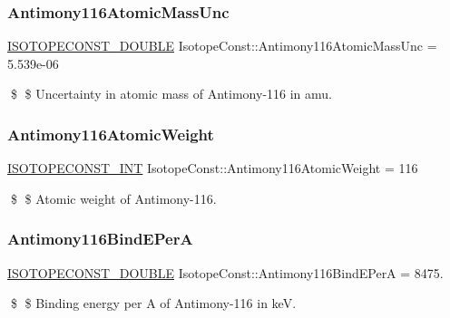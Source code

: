 \subsubsection{\texorpdfstring{Antimony116\+Atomic\+Mass\+Unc}{Antimony116AtomicMassUnc}}
{\footnotesize\ttfamily \mbox{\hyperlink{group___isotope_const-_macros_ga8f45a7272ce02c0b4c65c44636ed719a}{I\+S\+O\+T\+O\+P\+E\+C\+O\+N\+S\+T\+\_\+\+D\+O\+U\+B\+LE}} Isotope\+Const\+::\+Antimony116\+Atomic\+Mass\+Unc = 5.\+539e-\/06}

\$ \$ Uncertainty in atomic mass of Antimony-\/116 in amu. \mbox{\label{group___isotope_const-_antimony-_sb116_ga5ee9d85666ae084ef88a79a478d3381e}} 
\subsubsection{\texorpdfstring{Antimony116\+Atomic\+Weight}{Antimony116AtomicWeight}}
{\footnotesize\ttfamily \mbox{\hyperlink{group___isotope_const-_macros_ga5f18360b3e99483a35c32d789e62621c}{I\+S\+O\+T\+O\+P\+E\+C\+O\+N\+S\+T\+\_\+\+I\+NT}} Isotope\+Const\+::\+Antimony116\+Atomic\+Weight = 116}

\$ \$ Atomic weight of Antimony-\/116. \mbox{\label{group___isotope_const-_antimony-_sb116_gab26950c445904aa795c444d41533643e}} 
\subsubsection{\texorpdfstring{Antimony116\+Bind\+E\+PerA}{Antimony116BindEPerA}}
{\footnotesize\ttfamily \mbox{\hyperlink{group___isotope_const-_macros_ga8f45a7272ce02c0b4c65c44636ed719a}{I\+S\+O\+T\+O\+P\+E\+C\+O\+N\+S\+T\+\_\+\+D\+O\+U\+B\+LE}} Isotope\+Const\+::\+Antimony116\+Bind\+E\+PerA = 8475.}

\$ \$ Binding energy per A of Antimony-\/116 in keV. \mbox{\label{group___isotope_const-_antimony-_sb116_ga6096b1154e6456bb81245e9aa87344aa}} 
